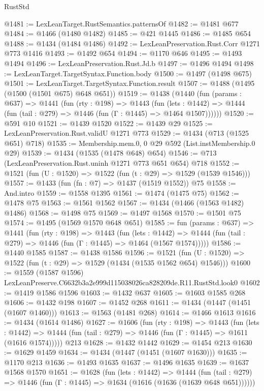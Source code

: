 \begin{lexlean}{RustStd}
\begin{coremodule}
@1481 := LexLeanTarget.RustSemantics.patternsOf
@1482 := @1481 @677
@1484 := @1466 (@1480 @1482)
@1485 := @421 @1445
@1486 := @1485 @654
@1488 := @1434 (@1484 @1486)
@1492 := LexLeanPreservation.Rust.Corr @1271 @773 @1416
@1493 := @1492 @654
@1494 := @1170 @646
@1495 := @1493 @1494
@1496 := LexLeanPreservation.Rust.Jd.b
@1497 := @1496 @1494
@1498 := LexLeanTarget.TargetSyntax.Function.body
@1500 := @1497 (@1498 @675)
@1501 := LexLeanTarget.TargetSyntax.Function.result
@1507 := @1488 (@1495 (@1500 (@1501 @675) @648 @651))
@1519 := @1438
    (@1440
      (fun (params : @637) =>
      @1441
        (fun (rty : @198) =>
        @1443
          (fun (lets : @1442) =>
          @1444 (fun (tail : @279) => @1446 (fun (Γ : @1445) => @1464 @1507))))))
@1520 := @591 @10
@1521 := @1439 @1520
@1522 := @1439 @29
@1525 := LexLeanPreservation.Rust.validU @1271 @773
@1529 := @1434 (@713 (@1525 @651) @718)
@1535 := Membership.mem.{0, 0} @29 @592 (List.instMembership.{0} @29)
@1539 := @1434 (@1535 (@1478 @648) @654)
@1546 := @713 (LexLeanPreservation.Rust.uninh @1271 @773 @651 @654) @718
@1552 := @1521 (fun (U : @1520) => @1522 (fun (t : @29) => @1529 (@1539 @1546)))
@1557 := @1433 (fun (fn : @7) => @1437 (@1519 @1552)) @75
@1558 := And.intro
@1559 := @1558 @1395
@1561 := @1474 (@1475 @75)
@1562 := @1478 @75
@1563 := @1561 @1562
@1567 := @1434 (@1466 (@1563 @1482) @1486)
@1568 := @1498 @75
@1569 := @1497 @1568
@1570 := @1501 @75
@1574 := @1495 (@1569 @1570 @648 @651)
@1585 := fun (params : @637) =>
  @1441
    (fun (rty : @198) =>
    @1443
      (fun (lets : @1442) =>
      @1444 (fun (tail : @279) => @1446 (fun (Γ : @1445) => @1464 (@1567 @1574)))))
@1586 := @1440 @1585
@1587 := @1438 @1586
@1596 := @1521 (fun (U : @1520) => @1522 (fun (t : @29) => @1529 (@1434 (@1535 @1562 @654) @1546)))
@1600 := @1559 (@1587 @1596) LexLeanPreserve.C6632b3a2e999d115038026ca828209de.R11.RustStd.look0
@1602 := @1419 @1586 @1596
@1603 := @1432 @637
@1605 := @1603 @1585 @268
@1606 := @1432 @198
@1607 := @1452 @268
@1611 := @1434 (@1447 (@1451 (@1607 @1460)))
@1613 := @1563 (@1481 @268)
@1614 := @1466 @1613
@1616 := @1434 (@1614 @1486)
@1627 := @1606
    (fun (rty : @198) =>
    @1443
      (fun (lets : @1442) =>
      @1444 (fun (tail : @279) => @1446 (fun (Γ : @1445) => @1611 (@1616 @1574)))))
    @213
@1628 := @1432 @1442
@1629 := @1454 @213
@1630 := @1629 @1459
@1634 := @1434 (@1447 (@1451 (@1607 @1630)))
@1635 := @1170 @213
@1636 := @1493 @1635
@1637 := @1496 @1635
@1639 := @1637 @1568 @1570
@1651 := @1628
    (fun (lets : @1442) =>
    @1444 (fun (tail : @279) => @1446 (fun (Γ : @1445) => @1634 (@1616 (@1636 (@1639 @648 @651))))))

\end{coremodule}
\end{lexlean}
